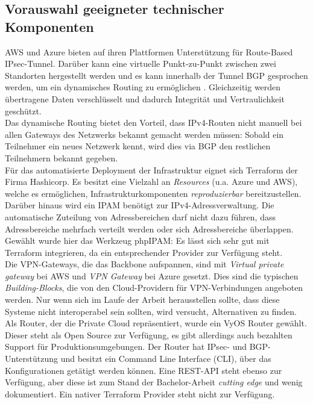 \subsection{Vorauswahl geeigneter technischer Komponenten}
AWS und Azure bieten auf ihren Plattformen Unterstützung für Route-Based \gls{IPsec}-Tunnel\cite[S.32]{awsvpn2021}. Darüber kann eine virtuelle Punkt-zu-Punkt zwischen zwei Standorten hergestellt werden und es kann innerhalb der Tunnel \gls{BGP} gesprochen werden, um ein dynamisches Routing zu ermöglichen\cite[S. 18]{AlShawi2020} \cite[S. 74-79]{Toroman2019}. Gleichzeitig werden übertragene Daten verschlüsselt und dadurch Integrität und Vertraulichkeit geschützt.\\
Das dynamische Routing bietet den Vorteil, dass IPv4-Routen nicht manuell bei allen Gateways des Netzwerks bekannt gemacht werden müssen: Sobald ein Teilnehmer ein neues Netzwerk kennt, wird dies via \gls{BGP} den restlichen Teilnehmern bekannt gegeben.\\
Für das automatisierte \gls{Deployment} der Infrastruktur eignet sich Terraform der Firma Hashicorp. Es besitzt eine Vielzahl an \textit{Resources} (u.a. Azure und AWS), welche es ermöglichen, Infrastrukturkomponenten \textit{reproduzierbar} bereitzustellen.\\
Darüber hinaus wird ein \gls{IPAM} benötigt zur IPv4-Adressverwaltung. Die automatische Zuteilung von Adressbereichen darf nicht dazu führen, dass Adressbereiche mehrfach verteilt werden oder sich Adressbereiche überlappen. Gewählt wurde hier das Werkzeug phpIPAM\cite{phpipam2020}: Es lässt sich sehr gut mit Terraform integrieren, da ein entsprechender Provider zur Verfügung steht\cite{phpipamtf2020}.\\
Die \gls{VPN-Gateway}s, die das \gls{Backbone} aufspannen, sind mit \textit{Virtual private gateway} bei AWS und \textit{VPN Gateway} bei Azure gesetzt. Dies sind die typischen \textit{Building-Blocks}, die von den Cloud-Providern für \gls{VPN}-Verbindungen angeboten werden. Nur wenn sich im Laufe der Arbeit herausstellen sollte, dass diese Systeme nicht interoperabel sein sollten, wird versucht, Alternativen zu finden.\\
Als Router, der die Private Cloud repräsentiert, wurde ein VyOS Router gewählt. Dieser steht als Open Source zur Verfügung, es gibt allerdings auch bezahlten Support für Produktionsumgebungen. Der Router hat \gls{IPsec}- und \gls{BGP}-Unterstützung und besitzt ein Command Line Interface (CLI), über das Konfigurationen getätigt werden können. Eine REST-API steht ebenso zur Verfügung, aber diese ist zum Stand der Bachelor-Arbeit \textit{cutting edge} und wenig dokumentiert\cite{vyosapi2021}. Ein nativer Terraform Provider steht nicht zur Verfügung.\\
